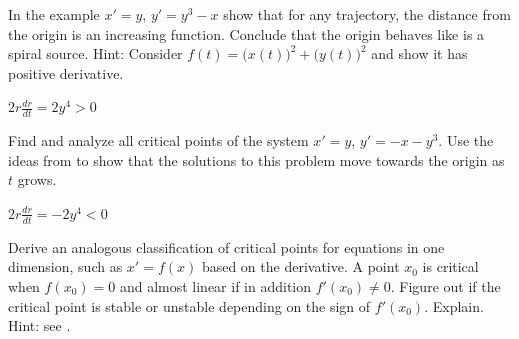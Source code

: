 \begin{exercise} \label{exercise:increasing}
In the example $x'=y$, $y'=y^3-x$ show that for any trajectory, the distance
from the origin is an increasing function.
Conclude
that the origin behaves like is a spiral source.
Hint: Consider $f(t) =
{\bigl(x(t)\bigr)}^2 + 
{\bigl(y(t)\bigr)}^2$ and show it has positive derivative.
\end{exercise}
\comboSol{%
}
{%
$2r\frac{dr}{dt} = 2y^4 > 0$
}

\begin{exercise}
Find and analyze all critical points of the system $x' = y$, $y' = -x - y^3$. Use the ideas from  to show that the solutions to this problem move towards the origin as $t$ grows.
\end{exercise}
\comboSol{%
}
{%
$2r\frac{dr}{dt} = -2y^4 < 0$
}

\begin{exercise}\ansMark%
Derive an analogous classification of critical points for equations in one dimension,
such as $x'= f(x)$ based on the derivative.  A point $x_0$ is critical when $f(x_0) = 0$ and
almost linear if in addition $f'(x_0) \not= 0$.  Figure out if the critical point is stable or unstable
depending on the sign of $f'(x_0)$.  Explain.  Hint: see .
\end{exercise}


\setcounter{exercise}{100}

